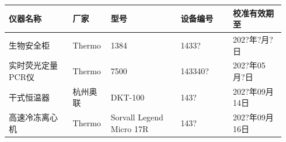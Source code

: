 \documentclass[UTF8,10pt,a4paper,fontset=fandol]{ctexart}
\newcommand{\fieldvalue}[1]{#1}
\newcommand{\handwritten}[1]{#1}
\begin{document}
\begin{tabular}{|p{0.22\linewidth}|p{0.12\linewidth}|p{0.24\linewidth}|p{0.18\linewidth}|p{0.18\linewidth}|}
\hline
仪器名称 & 厂家 & 型号 & 设备编号 & 校准有效期至 \\
\hline
\fieldvalue{生物安全柜} &
\fieldvalue{Thermo} &
\fieldvalue{1384} &
\fieldvalue{\handwritten{1433?}} &
\fieldvalue{\handwritten{202?年?月?日}}
\\ \hline
\fieldvalue{实时荧光定量PCR仪} &
\fieldvalue{Thermo} &
\fieldvalue{7500} &
\fieldvalue{\handwritten{143340?}} &
\fieldvalue{\handwritten{202?年05月?日}}
\\ \hline
\fieldvalue{干式恒温器} &
\fieldvalue{杭州奥联} &
\fieldvalue{DKT-100} &
\fieldvalue{\handwritten{143?}} &
\fieldvalue{\handwritten{202?年09月14日}}
\\ \hline
\fieldvalue{高速冷冻离心机} &
\fieldvalue{Thermo} &
\fieldvalue{Sorvall Legend Micro 17R} &
\fieldvalue{\handwritten{143?}} &
\fieldvalue{\handwritten{202?年09月16日}}
\\ \hline

\end{tabular}
\end{document}
